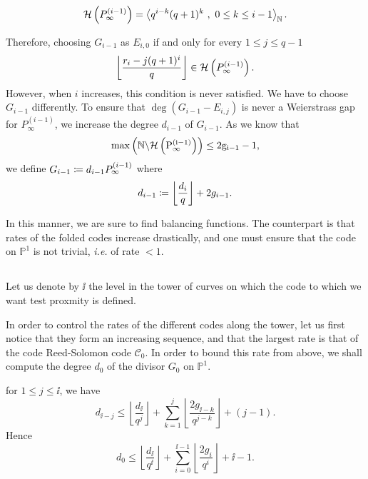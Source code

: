 \documentclass[10pt]{article}
\begin{document}
\[\mathcal{H}\left(P^{(i-1)}_{\infty}\right) = \left \langle q^{i-k}(q+1)^k \ , \ 0\leq k \leq i-1 \right\rangle_{\mathbb{N}}.\]

Therefore, choosing $G_{i-1}$ as $E_{i,0}$  if and only for every $1 \leq j \leq q-1$
\[ \left\lfloor \dfrac{r_i-j(q+1)^i}{q}\right\rfloor \in \mathcal{H}\left(P^{(i-1)}_{\infty}\right).\]
However, when $i$ increases, this condition is never satisfied. We have to choose $G_{i-1}$ differently.  To ensure that 
$\deg(G_{i-1}-E_{i,j})$ is never a Weierstrass gap for $P_{\infty}^{(i-1)}$, we increase the degree $d_{i-1}$ of $G_{i-1}$. As we know that 
\[\rm{max}\left(\mathbb{N} \backslash \mathcal{H}\left(P^{(i-1)}_{\infty}\right)\right) \leq 2g_{i-1} -1,\]
we define $G_{i-1}\coloneqq d_{i-1} P^{(i-1)}_{\infty}$ where
\begin{equation}\label{eq:deg_herm}
d_{i-1} \coloneqq \left\lfloor \dfrac{d_i}{q}\right\rfloor + 2g_{i-1}.
\end{equation}


In this manner, we are sure to find balancing functions. The counterpart is that rates of the folded codes increase drastically, and one must ensure that the code on $\mathbb{P}^1$ is not trivial, \textit{i.e.} of rate $< 1$. \\



\subsection{}

Let us denote by $\ii$ the level in the tower of curves on which the code to which we want test proxmity is defined.


In order to control the rates of the different codes along the tower, let us first notice that they form an increasing sequence, and that the largest rate is that of the code Reed-Solomon code $\mathcal{C}_0$. In order to bound this rate from above, we shall compute the degree $d_0$ of the divisor $G_0$ on $\mathbb{P}^1$. \\

\begin{lemma}\label{lem:deg_herm}
for $1 \leq j \leq \ii$, we have 
\[d_{\ii -j} \leq \left\lfloor \dfrac{d_{\ii}}{q^j}\right\rfloor + \sum\limits_{k=1}^j \left\lfloor \dfrac{2g_{\ii -k}}{q^{j-k}}\right\rfloor + (j-1).\]
Hence 
\[d_0 \leq \left\lfloor \dfrac{d_{\ii}}{q^{\ii}}\right\rfloor + \sum\limits_{i=0}^{\ii-1} \left\lfloor \dfrac{2g_i}{q^{i}}\right\rfloor + \ii-1.\]

\end{lemma}
\end{document}

